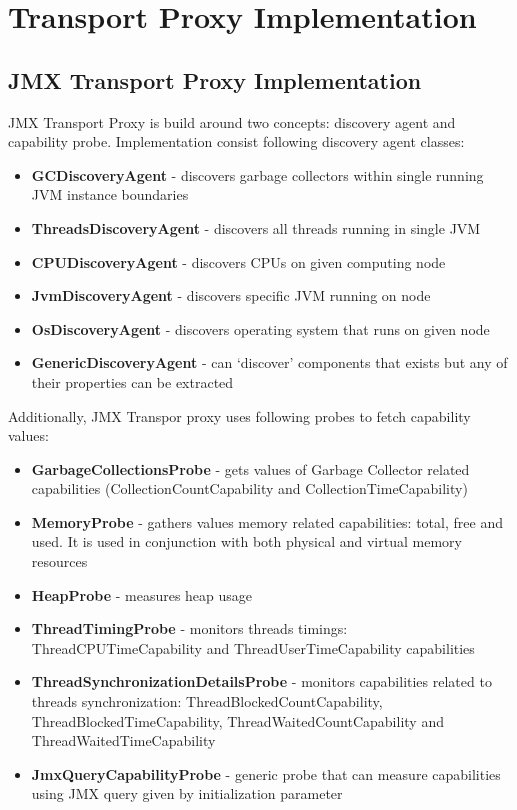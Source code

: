 \section{Transport Proxy Implementation}

\subsection{JMX Transport Proxy Implementation}

JMX Transport Proxy is build around two concepts: discovery agent and capability probe. Implementation consist following discovery agent classes:
\begin{itemize} 
  \item{\bf{GCDiscoveryAgent}} - discovers garbage collectors within single running JVM instance boundaries
  \item{\bf{ThreadsDiscoveryAgent}} - discovers all threads running in single JVM
  \item{\bf{CPUDiscoveryAgent}} - discovers CPUs on given computing node
  \item{\bf{JvmDiscoveryAgent}} - discovers specific JVM running on node
  \item{\bf{OsDiscoveryAgent}} - discovers operating system that runs on given node
  \item{\bf{GenericDiscoveryAgent}} - can \lq{}discover\rq{} components that exists but any of their properties can be extracted
\end{itemize} 

Additionally, JMX Transpor proxy uses following probes to fetch capability values: 
\begin{itemize} 
  \item{\bf{GarbageCollectionsProbe}} - gets values of Garbage Collector related capabilities (CollectionCountCapability and CollectionTimeCapability)
  \item{\bf{MemoryProbe}} - gathers values memory related capabilities: total, free and used. It is used in conjunction with both physical and virtual memory resources
  \item{\bf{HeapProbe}} - measures heap usage  
  \item{\bf{ThreadTimingProbe}} - monitors threads timings: ThreadCPUTimeCapability and ThreadUserTimeCapability capabilities
  \item{\bf{ThreadSynchronizationDetailsProbe}} - monitors capabilities related to threads synchronization: ThreadBlockedCountCapability, ThreadBlockedTimeCapability, ThreadWaitedCountCapability and ThreadWaitedTimeCapability
  \item{\bf{JmxQueryCapabilityProbe}} - generic probe that can measure capabilities using JMX query given by initialization parameter
\end{itemize} 

